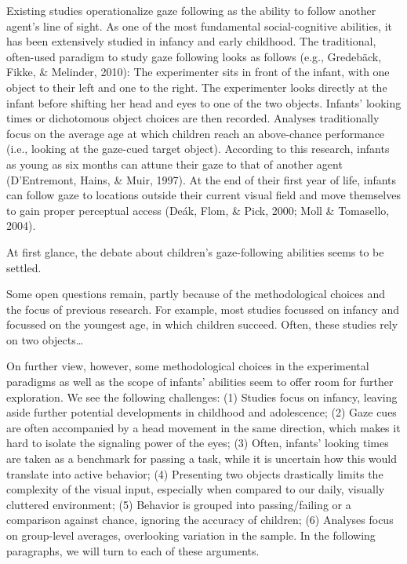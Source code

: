 \documentclass[
  man,mask,floatsintext]{apa6}
\begin{document}
Existing studies operationalize gaze following as the ability to follow another agent's line of sight. As one of the most fundamental social-cognitive abilities, it has been extensively studied in infancy and early childhood. The traditional, often-used paradigm to study gaze following looks as follows (e.g., Gredebäck, Fikke, \& Melinder, 2010): The experimenter sits in front of the infant, with one object to their left and one to the right. The experimenter looks directly at the infant before shifting her head and eyes to one of the two objects. Infants' looking times or dichotomous object choices are then recorded. Analyses traditionally focus on the average age at which children reach an above-chance performance (i.e., looking at the gaze-cued target object). According to this research, infants as young as six months can attune their gaze to that of another agent (D'Entremont, Hains, \& Muir, 1997). At the end of their first year of life, infants can follow gaze to locations outside their current visual field and move themselves to gain proper perceptual access (Deák, Flom, \& Pick, 2000; Moll \& Tomasello, 2004).

At first glance, the debate about children's gaze-following abilities seems to be settled.

Some open questions remain, partly because of the methodological choices and the focus of previous research. For example, most studies focussed on infancy and focussed on the youngest age, in which children succeed. Often, these studies rely on two objects\ldots{}

On further view, however, some methodological choices in the experimental paradigms as well as the scope of infants' abilities seem to offer room for further exploration. We see the following challenges: (1) Studies focus on infancy, leaving aside further potential developments in childhood and adolescence; (2) Gaze cues are often accompanied by a head movement in the same direction, which makes it hard to isolate the signaling power of the eyes; (3) Often, infants' looking times are taken as a benchmark for passing a task, while it is uncertain how this would translate into active behavior; (4) Presenting two objects drastically limits the complexity of the visual input, especially when compared to our daily, visually cluttered environment; (5) Behavior is grouped into passing/failing or a comparison against chance, ignoring the accuracy of children; (6) Analyses focus on group-level averages, overlooking variation in the sample. In the following paragraphs, we will turn to each of these arguments.
\end{document}
